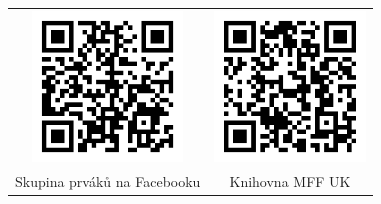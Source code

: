 \begin{tabular}{cc}
    \includegraphics[width=4cm]{QR/facebook.png}&
    \includegraphics[width=4cm]{QR/knihovna.png} \\
    Skupina prváků na Facebooku &
    Knihovna MFF UK
\end{tabular}